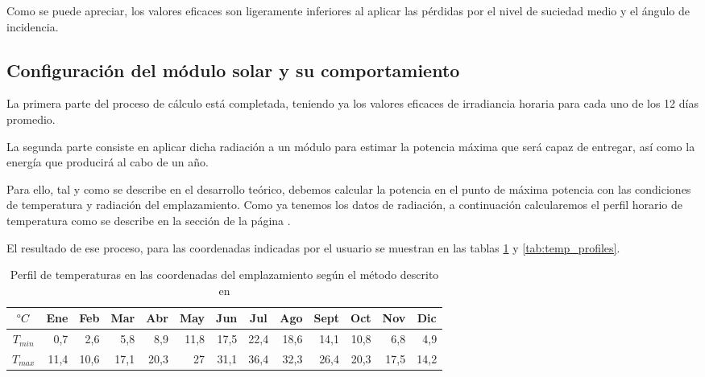 Como se puede apreciar, los valores eficaces son ligeramente inferiores al aplicar las pérdidas por el nivel de suciedad medio y el ángulo de incidencia.

\subsection{Configuración del módulo solar y su comportamiento}

La primera parte del proceso de cálculo está completada, teniendo ya los valores eficaces de irradiancia horaria para cada uno de los 12 días promedio.

La segunda parte consiste en aplicar dicha radiación a un módulo para estimar la potencia máxima que será capaz de entregar, así como la energía que producirá al cabo de un año.

Para ello, tal y como se describe en el desarrollo teórico, debemos calcular la potencia en el punto de máxima potencia con las condiciones de temperatura y radiación del emplazamiento. Como ya tenemos los datos de radiación, a continuación calcularemos el perfil horario de temperatura como se describe en la sección de la página \pageref{section:term_behaviour}.

El resultado de ese proceso, para las coordenadas indicadas por el usuario se muestran en las tablas \ref{tab:temp_min_max} y \ref{tab:temp_profiles}.

\begin{table}[ht]
\centering
\begin{tabular}{|c|r|r|r|r|r|r|r|r|r|r|r|r|}
\hline
$\degree C$ &
  \multicolumn{1}{c|}{Ene} &
  \multicolumn{1}{c|}{Feb} &
  \multicolumn{1}{c|}{Mar} &
  \multicolumn{1}{c|}{Abr} &
  \multicolumn{1}{c|}{May} &
  \multicolumn{1}{c|}{Jun} &
  \multicolumn{1}{c|}{Jul} &
  \multicolumn{1}{c|}{Ago} &
  \multicolumn{1}{c|}{Sept} &
  \multicolumn{1}{c|}{Oct} &
  \multicolumn{1}{c|}{Nov} &
  \multicolumn{1}{c|}{Dic} \\ \hline
$T_{min}$ & 0,7 & 2,6 & 5,8 & 8,9 & 11,8 & 17,5 & 22,4 & 18,6 & 14,1 & 10,8 & 6,8 & 4,9 \\ \hline
$T_{max}$ & 11,4 & 10,6 & 17,1 & 20,3 & 27 & 31,1 & 36,4 & 32,3 & 26,4 & 20,3 & 17,5 & 14,2 \\ \hline
\end{tabular}
\caption{Perfil de temperaturas en las coordenadas del emplazamiento según el método descrito en \cite{temp_paper} \label{tab:temp_min_max}}
\end{table}

